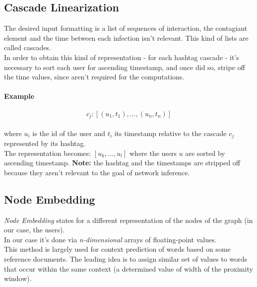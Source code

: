 \documentclass{article}
\begin{document}
		\subsection{Cascade Linearization}
			The desired input formatting is a list of sequences of interaction, the contagiant element and the time between each infection isn't relevant. This kind of lists are called cascades.\\
			In order to obtain this kind of representation - for each hashtag cascade - it's necessary to sort each user for ascending timestamp, and once did so, stripe off the time values, since aren't required for the computations.\\
			\paragraph{Example}
				\begin{addmargin}[1em]{0em}
					$$c_{j}: [(u_{1},t_{1}), ..., (u_{n},t_{n})]$$
					\\
					where $u_{i}$ is the id of the user and $t_{i}$ its timestamp relative to the cascade $c_{j}$ represented by its hashtag.\\
					The representation becomes: $[u_{k},...,u_{l}]$ where the users $u$ are sorted by ascending timestamp. \textbf{Note:} the hashtag and the timestamps are stripped off because they aren't relevant to the goal of network inference.
				\end{addmargin}
		\subsection{Node Embedding}
			\textit{Node Embedding} states for a different representation of the nodes of the graph (in our case, the users).\\
			In our case it's done via \textit{n-dimensional} arrays of floating-point values.\\
			This method is largely used for context prediction of words based on some reference documents. The leading idea is to assign similar set of values to words that occur within the same context (a determined value of width of the proximity window).\\
\end{document}
